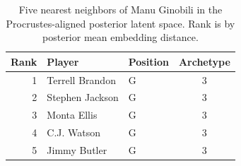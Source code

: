 \begin{table}[htbp]
  \centering\small
  \begin{tabular}{rllc}
    \toprule
    Rank & Player & Position & Archetype \\
    \midrule
    1 & Terrell Brandon & G & 3 \\
    2 & Stephen Jackson & G & 3 \\
    3 & Monta Ellis & G & 3 \\
    4 & C.J. Watson & G & 3 \\
    5 & Jimmy Butler & G & 3 \\
    \bottomrule
  \end{tabular}
  \caption{Five nearest neighbors of Manu Ginobili in the Procrustes-aligned posterior latent space. Rank is by posterior mean embedding distance.}
  \label{tab:Manu_Ginobili_neighbors}
\end{table}

